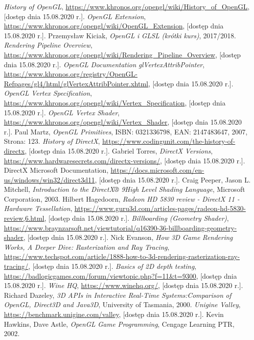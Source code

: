 \documentclass[archive]{mgr}
\begin{document}
\begin{thebibliography}{9}
\emph{History of OpenGL}, \url{https://www.khronos.org/opengl/wiki/History_of_OpenGL}, [dostęp dnia 15.08.2020 r.].
\emph{OpenGL Extension}, \url{https://www.khronos.org/opengl/wiki/OpenGL_Extension}, [dostęp dnia 15.08.2020 r.].
  Przemysław Kiciak,
  \emph{OpenGL i GLSL (krótki kurs)}, 2017/2018.
\emph{Rendering Pipeline Overview}, \url{https://www.khronos.org/opengl/wiki/Rendering_Pipeline_Overview}, [dostęp dnia 15.08.2020 r.].
\emph{OpenGL Documentation glVertexAttribPointer}, \url{https://www.khronos.org/registry/OpenGL-Refpages/gl4/html/glVertexAttribPointer.xhtml}, [dostęp dnia 15.08.2020 r.].
\emph{OpenGL Vertex Specification}, \url{https://www.khronos.org/opengl/wiki/Vertex_Specification}, [dostęp dnia 15.08.2020 r.].
\emph{OpenGL Vertex Shader}, \url{https://www.khronos.org/opengl/wiki/Vertex_Shader}, [dostęp dnia 15.08.2020 r.].
Paul Martz, \emph{OpenGL Primitives}, ISBN: 0321336798, EAN: 2147483647, 2007, Strona: 123.
\emph{History of DirectX}, \url{https://www.codingunit.com/the-history-of-directx}, [dostęp dnia 15.08.2020 r.].
Gabriel Torres, \emph{DirectX Versions}, \url{https://www.hardwaresecrets.com/directx-versions/}, [dostęp dnia 15.08.2020 r.].
DirectX Microsoft Documentation, \url{https://docs.microsoft.com/en-us/windows/win32/direct3d11}, [dostęp dnia 15.08.2020 r.].
Craig Peeper, Jason L. Mitchell, \emph{Introduction to the DirectX® 9High Level Shading Language}, Microsoft Corporation, 2003.
Hilbert Hagedoorn, \emph{Radeon HD 5830 review - DirectX 11 - Hardware Tessellation}, \url{https://www.guru3d.com/articles-pages/radeon-hd-5830-review,6.html}, [dostęp dnia 15.08.2020 r.].
\emph{Billboarding (Geometry Shader)}, \url{https://www.braynzarsoft.net/viewtutorial/q16390-36-billboarding-geometry-shader}, [dostęp dnia 15.08.2020 r.].
Nick Evanson, \emph{How 3D Game Rendering Works, A Deeper Dive: Rasterization and Ray Tracing}, \url{https://www.techspot.com/article/1888-how-to-3d-rendering-rasterization-ray-tracing/}, [dostęp dnia 15.08.2020 r.].
\emph{Basics of 2D depth testing}, \url{https://badlogicgames.com/forum/viewtopic.php?f=11&t=9300}, [dostęp dnia 15.08.2020 r.].
\emph{Wine HQ}, \url{https://www.winehq.org/}, [dostęp dnia 15.08.2020 r.].
Richard Dazeley, \emph{3D APIs in Interactive Real-Time Systems:Comparison of OpenGL, Direct3D and Java3D}, University of Tasmania, 2000.
\emph{Unigine Valley}, \url{https://benchmark.unigine.com/valley}, [dostęp dnia 15.08.2020 r.].
Kevin Hawkins, Dave Astle, \emph{OpenGL Game Programming}, Cengage Learning PTR, 2002.


\end{thebibliography}
\end{document}
